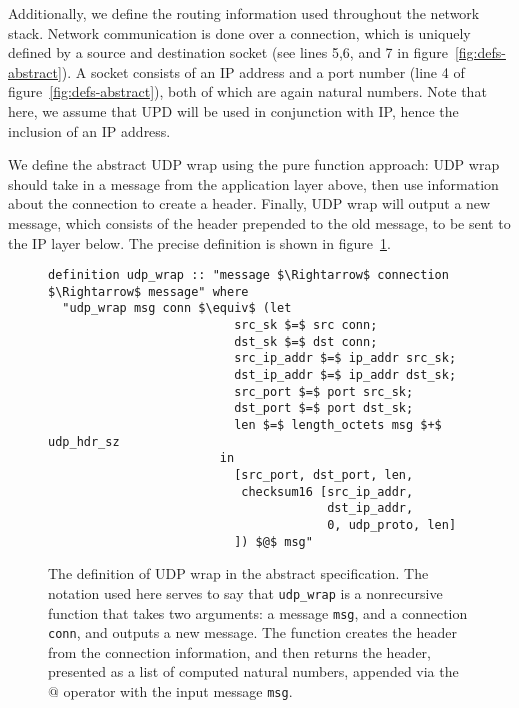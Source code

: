 \documentclass[twoside]{memoir}
\begin{document}
Additionally, we define the routing information used throughout the
network stack.
Network communication is done over a connection,
which is uniquely defined by a source and destination socket
(see lines 5,6, and 7 in figure~\ref{fig:defs-abstract}).
A socket consists of an IP address and a port number (line 4 of figure~\ref{fig:defs-abstract}), both of which are again natural numbers.
Note that here, we assume
that UPD will be used in conjunction with IP,
hence the inclusion of an IP address.


We define the abstract UDP wrap using the pure function approach:
UDP wrap should take in a message from the application layer above,
then use information about the connection to create a header.
Finally, UDP wrap will output a new message, which consists of the header
prepended to the old message, to be sent to the IP layer below.
The precise definition is shown in figure~\ref{fig:wrap-abstract}.

\begin{figure}[htpb]
    \centering
\begin{lstlisting}[language=isabelle]
definition udp_wrap :: "message $\Rightarrow$ connection $\Rightarrow$ message" where
  "udp_wrap msg conn $\equiv$ (let
                          src_sk $=$ src conn;
                          dst_sk $=$ dst conn;
                          src_ip_addr $=$ ip_addr src_sk;
                          dst_ip_addr $=$ ip_addr dst_sk;
                          src_port $=$ port src_sk;
                          dst_port $=$ port dst_sk;
                          len $=$ length_octets msg $+$ udp_hdr_sz
                        in
                          [src_port, dst_port, len,
                           checksum16 [src_ip_addr,
                                       dst_ip_addr,
                                       0, udp_proto, len]
                          ]) $@$ msg"
\end{lstlisting}
    \caption{The definition of UDP wrap in the abstract specification.
        The notation used here serves to say that \lstinline{udp_wrap}
        is a nonrecursive function that takes two arguments:
        a message \lstinline{msg}, and a connection \lstinline{conn},
        and outputs a new message.
        The function creates the header from the connection information,
        and then returns
        the header, presented as a list of computed natural numbers,
        appended via the $@$ operator with the input message
        \lstinline{msg}.
    }
    \label{fig:wrap-abstract}
\end{figure}
\end{document}
